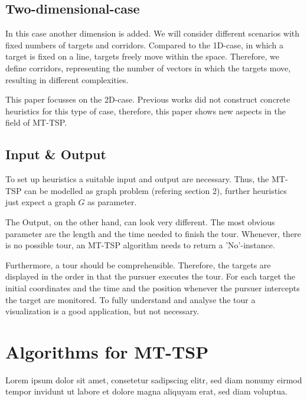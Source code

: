 \documentclass{acm_proc_article-sp}
\begin{document}
\subsection{Two-dimensional-case}

In this case another dimension is added. We will consider different scenarios with fixed numbers of targets and corridors. Compared to the 1D-case, in which a target is fixed on a line, targets freely move within the space. Therefore, we define corridors, representing the number of vectors in which the targets move, resulting in different complexities.

This paper focusses on the 2D-case. Previous works did not construct concrete heuristics for this type of case, therefore, this paper shows new aspects in the field of MT-TSP.

\subsection{Input \& Output}
To set up heuristics a suitable input and output are necessary. Thus, the MT-TSP can be modelled as graph problem (refering section 2), further heuristics just expect a graph $G$ as parameter. 

The Output, on the other hand, can look very different. The most obvious parameter are the length and the time needed to finish the tour. Whenever, there is no possible tour, an MT-TSP algorithm needs to return a 'No'-instance. 

Furthermore, a tour should be comprehensible. Therefore, the targets are displayed in the order in that the pursuer executes the tour. For each target the initial coordinates and the time and the position whenever the pursuer intercepts the target are monitored. To fully understand and analyse the tour a visualization is a good application, but not necessary. 

\section{Algorithms for MT-TSP}
Lorem ipsum dolor sit amet, consetetur sadipscing elitr, sed diam nonumy eirmod tempor invidunt ut labore et dolore magna aliquyam erat, sed diam voluptua.
\end{document}
